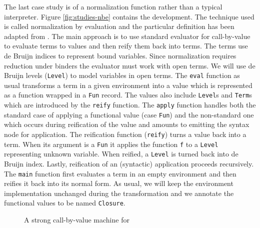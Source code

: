 The last case study is of a normalization function rather than a typical interpreter.
Figure \ref{fig:studies-nbe} contains the development.
The technique used is called normalization by evaluation and the particular definition has been adapted from \cite{abel-nbe}.
The main approach is to use standard evaluator for call-by-value \LC{} to evaluate terms to values and then reify them back into terms.
The terms use de Bruijn indices to represent bound variables.
Since normalization requires reduction under binders the evaluator must work with open terms.
We will use de Bruijn levels (\lstinline!Level!) to model variables in open terms.
The \lstinline!eval! function as usual transforms a term in a given environment into a value which is represented as a function wrapped in a \lstinline!Fun! record.
The values also include \lstinline!Level!s and \lstinline!Term!s which are introduced by the \lstinline!reify! function.
The \lstinline!apply! function handles both the standard case of applying a functional value (case \lstinline!Fun!) and the non-standard one which occurs during reification of the value and amounts to emitting the syntax node for application.
The reification function (\lstinline!reify!) turns a value back into a term.
When its argument is a \lstinline!Fun! it applies the function \lstinline!f! to a \lstinline!Level! representing unknown variable.
When reified, a \lstinline!Level! is turned back into de Bruijn index.
Lastly, reification of an (syntactic) application proceeds recursively.
The \lstinline!main! function first evaluates a term in an empty environment and then reifies it back into its normal form.
As usual, we will keep the environment implementation unchanged during the transformation and we annotate the functional values to be named \lstinline!Closure!.

\begin{figure}
  
  \caption{A strong call-by-value machine for \LC{}}
  \label{fig:studies-nbe-machine}
\end{figure}

